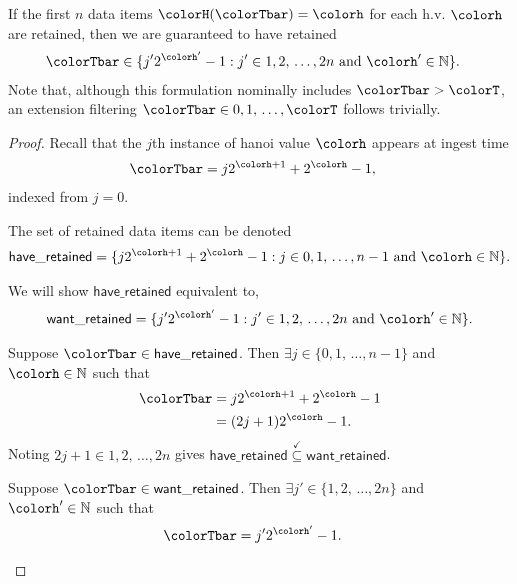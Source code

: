 \begin{lemma}
\label{thm:retained-equivalence-stretched}
If the first $n$ data items $\colorH(\colorTbar) = \colorh$ for each h.v. $\colorh$ are retained, then we are guaranteed to have retained
\begin{align*}
\colorTbar
&\in
\{
  j'2^{\colorh'} - 1
  :
  j' \in 1,2,\,\ldots,2n
  \text{ and }
  \colorh' \in \mathbb{N}
\}.
\end{align*}
Note that, although this formulation nominally includes $\colorTbar > \colorT$, an extension filtering $\colorTbar \in 0,1,\,\ldots,\colorT$ follows trivially.
\end{lemma}
\begin{proof}

Recall that the $j$th instance of hanoi value $\colorh$ appears at ingest time
\begin{align*}
\colorTbar
&= j2^{\colorh + 1} + 2^{\colorh} - 1,
\end{align*}
indexed from $j=0$.

The set of retained data items can be denoted
\begin{align*}
\mathsf{have\_retained} =
\{
  j2^{\colorh + 1} + 2^{\colorh} - 1
  :
  j \in 0,1,\,\ldots,n-1
  \text{ and }
  \colorh \in \mathbb{N}
\}.
\end{align*}

We will show $\mathsf{have\_retained}$ equivalent to,
\begin{align*}
\mathsf{want\_retained} =
\{
  j'2^{\colorh'} - 1
  :
  j' \in 1,2,\,\ldots,2n
  \text{ and }
  \colorh' \in \mathbb{N}
\}.
\end{align*}

\begin{proofpart}
Suppose $\colorTbar \in \mathsf{have\_retained}$.
Then $\exists j \in \{0,1,\,\ldots,n-1\}$ and $\colorh \in \mathbb{N}$ such that
\begin{align*}
\colorTbar
&= j2^{\colorh + 1} + 2^{\colorh} - 1\\
&= (2j + 1)2^{\colorh} - 1.
\end{align*}
Noting $2j + 1 \in 1,2,\,\ldots,2n$ gives $\mathsf{have\_retained} \stackrel{\checkmark}{\subseteq} \mathsf{want\_retained}$.
\end{proofpart}

\begin{proofpart}
Suppose $\colorTbar \in \mathsf{want\_retained}$.
Then $\exists j'\in\{1,2,\,\ldots,2n\}$ and $\colorh' \in \mathbb{N}$ such that
\begin{align*}
\colorTbar
&= j'2^{\colorh'} - 1.
\end{align*}


\end{proofpart}
\end{proof}

